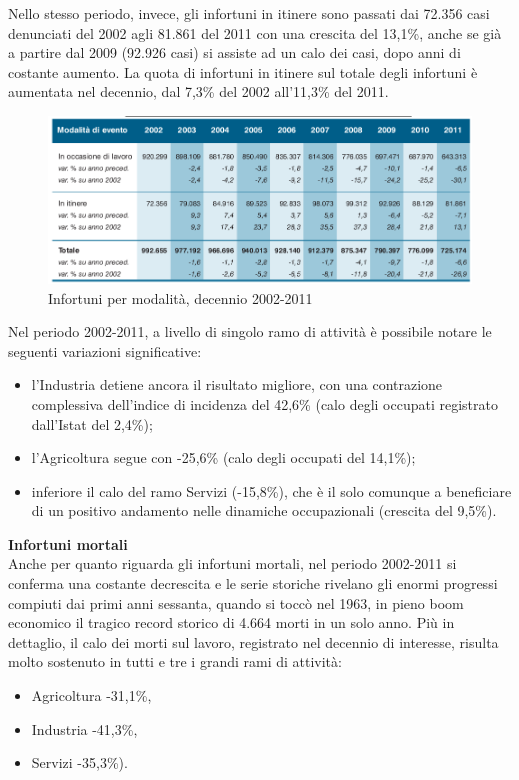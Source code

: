 Nello stesso periodo, invece, gli infortuni in itinere sono passati dai 72.356 casi denunciati del 2002 agli 81.861 del 2011 con una crescita del 13,1\%, anche se già a partire dal
2009 (92.926 casi) si assiste ad un calo dei casi, dopo anni di costante aumento.
La quota di infortuni in itinere sul totale degli infortuni è aumentata nel decennio, dal
7,3\% del 2002 all’11,3\% del 2011.


\begin{figure}[H]
\centering
\includegraphics[scale=0.55]{images/cap4/analisiDiMercato/infortuniDecennioPerModalita}
\caption{Infortuni per modalità, decennio 2002-2011}
\end{figure}




Nel periodo 2002-2011, a livello di singolo ramo di attività è possibile notare le seguenti variazioni significative:
\begin{itemize}
\item l’Industria detiene ancora il risultato migliore, con una contrazione complessiva dell’indice di incidenza del 42,6\% (calo degli occupati registrato dall’Istat del 2,4\%);
\item l’Agricoltura segue con -25,6\% (calo degli occupati del 14,1\%);
\item inferiore il calo del ramo Servizi (-15,8\%), che è il solo comunque a beneficiare di
un positivo andamento nelle dinamiche occupazionali (crescita del 9,5\%).\\
\end{itemize}


\textbf{Infortuni mortali}\\
Anche per quanto riguarda gli infortuni mortali, nel periodo 2002-2011 si conferma una costante decrescita e le serie storiche rivelano gli enormi progressi compiuti dai primi anni sessanta, quando si toccò nel 1963, in pieno boom economico il tragico record storico di 4.664 morti in un solo anno.
Più in dettaglio, il calo dei morti sul lavoro, registrato nel decennio di interesse, risulta molto
sostenuto in tutti e tre i grandi rami di attività:
\begin{itemize}
\item Agricoltura -31,1\%,
\item Industria -41,3\%,
\item Servizi -35,3\%).\\
\end{itemize}

